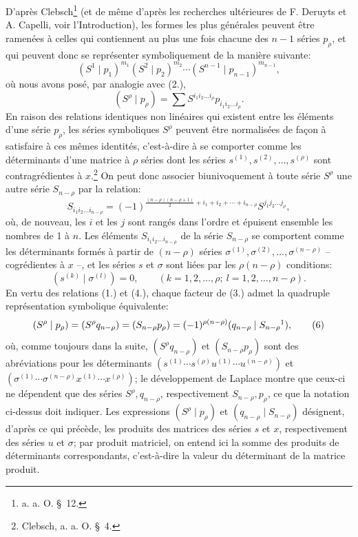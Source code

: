 \documentclass[11pt]{article}
\begin{document}
D'après Clebsch\footnote{a. a. O. \S\ 12.} (et de même d'après les recherches ultérieures de F. Deruyts et A. Capelli, voir l'Introduction), les formes les plus générales peuvent être ramenées à celles qui contiennent au plus une fois chacune des $n-1$ séries $p_\rho$, et qui peuvent donc se représenter symboliquement de la manière suivante:
\begin{equation}
 (S^1\mid p_1)^{m_1}(S^2\mid p_2)^{m_2}\cdots(S^{n-1}\mid p_{n-1})^{m_{n-1}},
\tag{3}
\end{equation}
où nous avons posé, par analogie avec (2.),
\[
 (S^\rho\mid p_\rho)=\sum S^{i_1i_2\ldots i_\rho}p_{i_1i_2\ldots i_\rho}.
\]
En raison des relations identiques non linéaires qui existent entre les éléments d'une série $p_\rho$, les séries symboliques $S^\rho$ peuvent être normalisées de façon à satisfaire à ces mêmes identités, c'est-à-dire à se comporter comme les déterminants d'une matrice à $\rho$ séries dont les séries $s^{(1)},s^{(2)},\ldots,s^{(\rho)}$ sont contragrédientes à $x$.\footnote{Clebsch, a. a. O. \S\ 4.} On peut donc associer biunivoquement à toute série $S^\rho$ une autre série $S_{n-\rho}$ par la relation:
\begin{equation}
 S_{i_1i_2\ldots i_{n-\rho}}=(-1)^{\frac{(n-\rho)(n-\rho+1)}2+i_1+i_2+\cdots+i_{n-\rho}}S^{j_1j_2\ldots j_\rho},
\tag{4}
\end{equation}
où, de nouveau, les $i$ et les $j$ sont rangés dans l'ordre et épuisent ensemble les nombres de 1 à $n$. Les éléments $S_{i_1i_2\ldots i_{n-\rho}}$ de la série $S_{n-\rho}$ se comportent comme les déterminants formés à partir de $(n-\rho)$ séries $\sigma^{(1)},\sigma^{(2)},\ldots,\sigma^{(n-\rho)}$ -- cogrédientes à $x$ --, et les séries $s$ et $\sigma$ sont liées par les $\rho(n-\rho)$ conditions:
\begin{equation}
 (s^{(k)}\mid \sigma^{(l)})=0,\qquad(k=1,2,\ldots,\rho;\ l=1,2,\ldots,n-\rho).
\tag{5}
\end{equation}
En vertu des relations (1.) et (4.), chaque facteur de (3.) admet la quadruple représentation symbolique équivalente:
\begin{equation}
 (S^\rho\mid p_\rho)=(S^\rho q_{n-\rho})=(S_{n-\rho}p_\rho)=(-1)^{\rho(n-\rho)}(q_{n-\rho}\mid S_{n-\rho}\footnotemark),
\tag{6}
\end{equation}
où, comme toujours dans la suite, $(S^\rho q_{n-\rho})$ et $(S_{n-\rho}p_\rho)$ sont des abréviations pour les déterminants $(s^{(1)}\cdots s^{(\rho)}u^{(1)}\cdots u^{(n-\rho)})$ et $(\sigma^{(1)}\cdots\sigma^{(n-\rho)}x^{(1)}\cdots x^{(\rho)})$; le développement de Laplace montre que ceux-ci ne dépendent que des séries $S^\rho,q_{n-\rho}$, respectivement $S_{n-\rho},p_\rho$, ce que la notation ci-dessus doit indiquer. Les expressions $(S^\rho\mid p_\rho)$ et $(q_{n-\rho}\mid S_{n-\rho})$ désignent, d'après ce qui précède, les produits des matrices des séries $s$ et $x$, respectivement des séries $u$ et $\sigma$; par produit matriciel, on entend ici la somme des produits de déterminants correspondants, c'est-à-dire la valeur du déterminant de la matrice produit.
\end{document}
